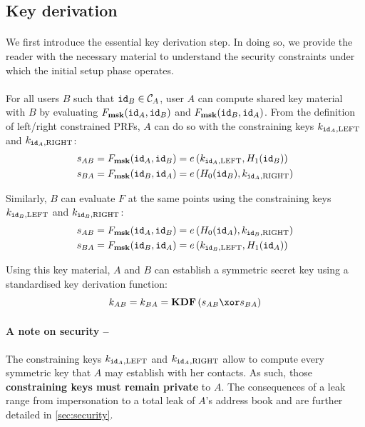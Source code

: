 	\subsection{Key derivation}
	
		\paragraph{} We first introduce the essential key derivation step. In doing so, we provide the reader with the necessary material to understand the security constraints under which the initial setup phase operates.
		
		\paragraph{} For all users $B$ such that $\mathtt{id}_B \in \mathcal{C}_A$, user $A$ can compute shared key material with $B$ by evaluating $F_{\mathbf{msk}}(\mathtt{id}_A, \mathtt{id}_B)$ and $F_{\mathbf{msk}}(\mathtt{id}_B, \mathtt{id}_A)$. From the definition of left/right constrained PRFs, $A$ can do so with the constraining keys $k_{\mathtt{id}_A,\mathrm{LEFT}}$ and $k_{\mathtt{id}_A,\mathrm{RIGHT}}$:
		\begin{align}
			s_{AB} = F_{\mathbf{msk}}(\mathtt{id}_A, \mathtt{id}_B) &= e\left(k_{\mathtt{id}_A,\mathrm{LEFT}}, H_1(\mathtt{id}_B) \right) \\
			s_{BA} = F_{\mathbf{msk}}(\mathtt{id}_B, \mathtt{id}_A) &= e\left(H_0(\mathtt{id}_B), k_{\mathtt{id}_A,\mathrm{RIGHT}} \right)
		\end{align} 
	
	\noindent Similarly, $B$ can evaluate $F$ at the same points using the constraining keys $k_{\mathtt{id}_B,\mathrm{LEFT}}$ and $k_{\mathtt{id}_B,\mathrm{RIGHT}}$:		
		\begin{align}
			s_{AB} = F_{\mathbf{msk}}(\mathtt{id}_A, \mathtt{id}_B) &= e\left(H_0(\mathtt{id}_A), k_{\mathtt{id}_B,\mathrm{RIGHT}} \right) \\
			s_{BA} = F_{\mathbf{msk}}(\mathtt{id}_B, \mathtt{id}_A) &= e\left(k_{\mathtt{id}_B,\mathrm{LEFT}}, H_1(\mathtt{id}_A) \right) 
		\end{align}
	
\noindent Using this key material, $A$ and $B$ can establish a symmetric secret key using a standardised key derivation function:
	\begin{equation}
		k_{AB} = k_{BA} = \mathbf{KDF}\left(s_{AB} \xor s_{BA}\right)
	\end{equation}
	
	\paragraph{A note on security --} The constraining keys $k_{\mathtt{id}_A,\mathrm{LEFT}}$ and $k_{\mathtt{id}_A,\mathrm{RIGHT}}$ allow to compute every symmetric key that $A$ may establish with her contacts. As such, those \textbf{constraining keys must remain private} to $A$. The consequences of a leak range from impersonation to a total leak of $A$'s address book and are further detailed in \autoref{sec:security}.
	
